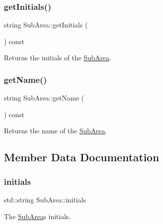 \subsubsection{\texorpdfstring{get\+Initials()}{getInitials()}}
{\footnotesize\ttfamily string Sub\+Area\+::get\+Initials (\begin{DoxyParamCaption}{ }\end{DoxyParamCaption}) const}



Returns the initials of the \hyperlink{classSubArea}{Sub\+Area}. 

\mbox{\label{classSubArea_a8370d762b413cb20c233cf0ca56315da}} 
\subsubsection{\texorpdfstring{get\+Name()}{getName()}}
{\footnotesize\ttfamily string Sub\+Area\+::get\+Name (\begin{DoxyParamCaption}{ }\end{DoxyParamCaption}) const}



Returns the name of the \hyperlink{classSubArea}{Sub\+Area}. 



\subsection{Member Data Documentation}
\mbox{\label{classSubArea_a3e0a456f5ce325e2a778a17d1929b5d0}} 
\subsubsection{\texorpdfstring{initials}{initials}}
{\footnotesize\ttfamily std\+::string Sub\+Area\+::initials\hspace{0.3cm}{\ttfamily [private]}}



The \hyperlink{classSubArea}{Sub\+Area}\textquotesingle{}s initials. 

\mbox{\label{classSubArea_aa1b0997da15caea7144ae73963da9f82}} 
